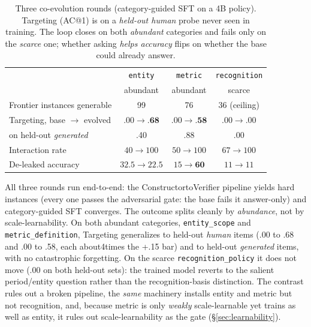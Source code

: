 \begin{table}[t]
\centering

\small
\begin{tabular}{lccc}
\toprule
 & \texttt{entity} & \texttt{metric} & \texttt{recognition} \\
 & \footnotesize abundant & \footnotesize abundant & \footnotesize scarce \\
\midrule
Frontier instances generable        & 99 & 76 & 36 (ceiling) \\
Targeting, base $\to$ evolved        & $.00\to\textbf{.68}$ & $.00\to\textbf{.58}$ & $.00\to.00$ \\
\;\;on held-out \emph{generated}     & .40 & .88 & .00 \\
Interaction rate                     & $40\to100$ & $50\to100$ & $67\to100$ \\
De-leaked accuracy                   & $32.5\to22.5$ & $15\to\textbf{60}$ & $11\to11$ \\
\bottomrule
\end{tabular}
\caption{Three co-evolution rounds (category-guided SFT on a 4B policy). Targeting
(AC@1) is on a \emph{held-out human} probe never seen in training. The loop
closes on both \emph{abundant} categories and fails only on the \emph{scarce} one; whether
asking \emph{helps accuracy} flips on whether the base could already answer.}
\label{tab:coevolve}
\end{table}

All three rounds run end-to-end: the ConstructortoVerifier pipeline yields hard
instances (every one passes the adversarial gate: the base fails it answer-only)
and category-guided SFT converges. The outcome splits cleanly by \emph{abundance}, not
by scale-learnability. On both abundant categories, \texttt{entity\_scope} and
\texttt{metric\_definition}, Targeting generalizes to held-out \emph{human} items
(.00 to .68 and .00 to .58, each about4times the +.15 bar) and to held-out
\emph{generated} items, with no catastrophic forgetting. On the scarce
\texttt{recognition\_policy} it does not move (.00 on both held-out sets): the
trained model reverts to the salient period/entity question rather than the
recognition-basis distinction. The contrast rules out a broken pipeline, the
\emph{same} machinery installs entity and metric but not recognition, and, because
metric is only \emph{weakly} scale-learnable yet trains as well as entity, it rules
out scale-learnability as the gate (\S\ref{sec:learnability}).

